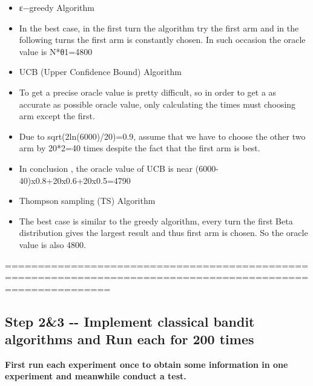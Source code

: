 \documentclass[11pt]{article}
\providecommand{\tightlist}{%
      \setlength{\itemsep}{0pt}\setlength{\parskip}{0pt}}
\begin{document}
    \begin{itemize}
\tightlist
\item
  ε−greedy Algorithm
\item
  In the best case, in the first turn the algorithm try the first arm
  and in the following turns the first arm is constantly chosen. In such
  occasion the oracle value is N*θ1=4800
\item
  UCB (Upper Confidence Bound) Algorithm
\item
  To get a precise oracle value is pretty difficult, so in order to get
  a as accurate as possible oracle value, only calculating the times
  must choosing arm except the first.
\item
  Due to sqrt(2ln(6000)/20)=0.9, assume that we have to choose the other
  two arm by 20*2=40 times despite the fact that the first arm is best.
\item
  In conclusion , the oracle value of UCB is near
  (6000-40)x0.8+20x0.6+20x0.5=4790
\item
  Thompson sampling (TS) Algorithm
\item
  The best case is similar to the greedy algorithm, every turn the first
  Beta distribution gives the largest result and thus first arm is
  chosen. So the oracle value is also 4800.
\end{itemize}

    ============================================================================================================

    \subsection{Step 2\&3 -\/- Implement classical bandit algorithms and Run
each for 200
times}\label{step-23----implement-classical-bandit-algorithms-and-run-each-for-200-times}

    \textbf{First run each experiment once to obtain some information in one
experiment and meanwhile conduct a test.}
\end{document}

